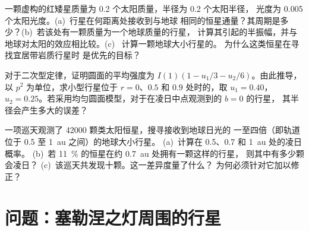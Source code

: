 \begin{exercise}[$\star\star\star$]\label{exo:b3:exoplanets:10}
一颗虚构的红矮星质量为 0.2 个太阳质量，半径为 0.2 个太阳半径，
光度为 \num{0.005} 个太阳光度。(a)~行星在何距离处接收到与地球
相同的恒星通量？其周期是多少？(b)~若该处有一颗质量为一个地球质量的行星，
计算其引起的半振幅，并与地球对太阳的效应相比较。(c)~
计算一颗地球大小行星的。
为什么这类恒星在寻找宜居带岩质行星时
是优先的目标？
\end{exercise}

\begin{exercise}[$\star\star\star$]\label{exo:b3:exoplanets:11}
对于二次型定律，证明圆面的平均强度为
$I(1)(1 - u_1/3 - u_2/6)$。由此推导，
以 $p^2$ 为单位，求小型行星位于 $r = 0$、$0.5$ 和 $0.9$ 处时的，取 $u_1 = 0.40$，
$u_2 = 0.25$。若采用均匀圆面模型，对于在凌日中点观测到的 $b = 0$ 的行星，
其半径会产生多大的误差？
\end{exercise}

\begin{exercise}[$\star\star\star$]\label{exo:b3:exoplanets:12}
一项巡天观测了 \num{42000} 颗类太阳恒星，搜寻接收到地球日光的
一至四倍（即轨道位于 0.5 至 \qty{1}{au} 之间）的地球大小行星。
(a)~计算在 0.5、0.7 和 \qty{1}{au} 处的凌日概率。
(b)~若 \qty{11}{\percent} 的恒星在约 \qty{0.7}{au} 处拥有一颗这样的行星，
则其中有多少颗会凌日？
(c)~该巡天共发现十颗。这一差异度量了什么？
为何必须针对它加以修正？
\end{exercise}

\section{问题：塞勒涅之灯周围的行星}

